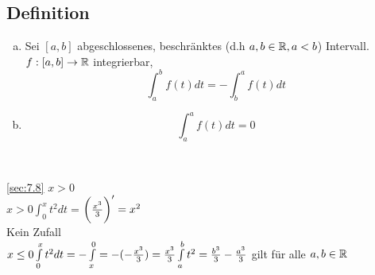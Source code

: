 \subsection{Definition}\label{sec:8.1}
\begin{enumerate}[a)]
	\item Sei $[a,b]$ abgeschlossenes, beschränktes (d.h $a,b \in \mathbb{R} , a < b$) Intervall.\\
	$f : [a,b] \to \mathbb{R}$ integrierbar,\\
	\[ \int_{a}^{b} f(t) dt = - \int_{b}^{a} f(t) dt \]
	\item \[ \int_{a}^{a} f(t) dt = 0 \]
\end{enumerate} \
\begin{table}[h!]
	\centering
	\begin{minipage}[t]{0.7\textwidth}
		\ref{sec:7.8} $x >0$\\
		$ x > 0 \int_{0}^{x} t^2 dt = $$ \\ \biggl(\frac{x^3}{3}\biggr)' = x^2$\\ Kein Zufall\\
		$x \le 0\\
		\int\limits_{0}^{x}t^2dt = - \int\limits_{x}^{0} = -(-\frac{x^3}{3}) = \frac{x^3}{3}\\
		\int\limits_{a}^{b}t^2 = \frac{b^3}{3} - \frac{a^3}{3}$ gilt für alle $a,b \in \mathbb{R}$
	\end{minipage}
\end{table} 
